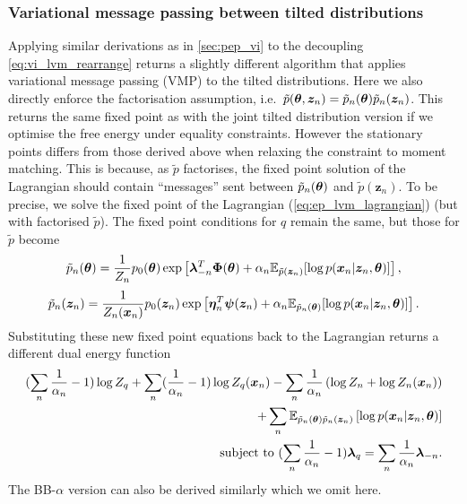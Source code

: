 \subsubsection{Variational message passing between tilted distributions}
Applying similar derivations as in \ref{sec:pep_vi} to the decoupling \ref{eq:vi_lvm_rearrange} returns a slightly different algorithm that applies variational message passing (VMP) \citep{winn:vmp2005} to the tilted distributions.
%
Here we also directly enforce the factorisation assumption, i.e.~$\tilde{p}(\bm{\theta}, \bm{z}_n) = \tilde{p}_n(\bm{\theta}) \tilde{p}_n(\bm{z}_n)$. This returns the same fixed point as with the joint tilted distribution version if we optimise the free energy under equality constraints. However the stationary points differs from those derived above when relaxing the constraint to moment matching. This is because, as $\tilde{p}$ factorises, the fixed point solution of the Lagrangian should contain ``messages'' sent between $\tilde{p}_n(\bm{\theta})$ and $\tilde{p}(\bm{z}_n)$. To be precise, we solve the fixed point of the Lagrangian (\ref{eq:ep_lvm_lagrangian}) (but with factorised $\tilde{p}$). The fixed point conditions for $q$ remain the same, but those for $\tilde{p}$ become
\begin{equation}
\tilde{p}_n(\bm{\theta}) = \frac{1}{Z_n} p_0(\bm{\theta}) \exp \left[ \bm{\lambda}_{-n}^T \bm{\Phi}(\bm{\theta}) + \alpha_n \mathbb{E}_{\tilde{p}(\bm{z}_n)}[\log p( \bm{x}_n | \bm{z}_n, \bm{\theta}) ] \right],
\end{equation}
\begin{equation}
\tilde{p}_n(\bm{z}_n) = \frac{1}{Z_n(\bm{x}_n)} p_0(\bm{z}_n) \exp \left[ \bm{\eta}_n^T \bm{\psi}(\bm{z}_n) + \alpha_n \mathbb{E}_{\tilde{p}_n(\bm{\theta})}[\log p( \bm{x}_n | \bm{z}_n, \bm{\theta}) ] \right].
\end{equation}
Substituting these new fixed point equations back to the Lagrangian returns a different dual energy function
\begin{equation}
\begin{aligned}
(\sum_n \frac{1}{\alpha_n} - 1) \log Z_q + \sum_n (\frac{1}{\alpha_n} - 1) \log Z_q(\bm{x}_n) - \sum_n \frac{1}{\alpha_n} \left( \log Z_n + \log Z_n(\bm{x}_n) \right) \\
+ \sum_n \mathbb{E}_{\tilde{p}_n(\bm{\theta}) \tilde{p}_n(\bm{z}_n)} \left[ \log p(\bm{x}_n|\bm{z}_n, \bm{\theta}) \right] \\
\text{subject to } (\sum_n \frac{1}{\alpha_n} - 1) \bm{\lambda}_q = \sum_n \frac{1}{\alpha_n} \bm{\lambda}_{-n}.
\end{aligned}
\end{equation}
The BB-$\alpha$ version can also be derived similarly which we omit here. 

